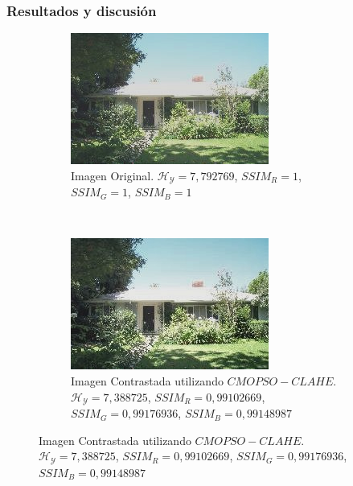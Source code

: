 \documentclass[usenames,dvipsnames]{beamer}
\begin{document}
\begin{frame}
\frametitle{Resultados y discusión} 

\begin{figure}[H]
\centering
\begin{subfigure}[t]{0.45\textwidth}
\includegraphics[width=\textwidth]{graphics/calhouse_0230.jpg}
\caption{Imagen Original. $\mathscr{H_Y}=7,792769$, $SSIM_R=1$, $SSIM_G=1$, $SSIM_B=1$}
\label{fig:casa1original}
\end{subfigure}
    ~ %
      \begin{subfigure}[t]{0.45\textwidth}
      \includegraphics[width=\textwidth]{graphics/calhouse_0230_20-25165283474-10.jpg}
      \caption{Imagen Contrastada utilizando $CMOPSO-CLAHE$. $\mathscr{H_Y}=7,388725$, $SSIM_R=0,99102669$, $SSIM_G=0,99176936$, $SSIM_B=0,99148987$}

\end{subfigure}
\end{figure}
\end{frame}
\end{document}
